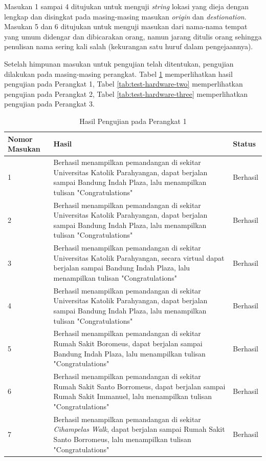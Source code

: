 Masukan 1 sampai 4 ditujukan untuk menguji \textit{string} lokasi yang dieja dengan lengkap dan disingkat pada masing-masing masukan \textit{origin} dan \textit{destionation}. Masukan 5 dan 6 ditujukan untuk menguji masukan dari nama-nama tempat yang umum didengar dan dibicarakan orang, namun jarang ditulis orang sehingga penulisan nama sering kali salah (kekurangan satu huruf dalam pengejaannya).

Setelah himpunan masukan untuk pengujian telah ditentukan, pengujian dilakukan pada masing-masing perangkat. Tabel \ref{tab:test-hardware-one} memperlihatkan hasil pengujian pada Perangkat 1, Tabel \ref{tab:test-hardware-two} memperlihatkan pengujian pada Perangkat 2, Tabel \ref{tab:test-hardware-three} memperlihatkan pengujian pada Perangkat 3.

\begin{table}[]
    \centering
    \caption{Hasil Pengujian pada Perangkat 1}
    \begin{tabular}{|p{3cm}||p{7cm}|p{4cm}|}
    \hline
       Nomor Masukan & Hasil & Status \\
    \hline \hline
        1 & Berhasil menampilkan pemandangan di sekitar Universitas Katolik Parahyangan, dapat berjalan sampai Bandung Indah Plaza, lalu menampilkan tulisan "Congratulations" & Berhasil\\
    \hline
        2 & Berhasil menampilkan pemandangan di sekitar Universitas Katolik Parahyangan, dapat berjalan sampai Bandung Indah Plaza, lalu menampilkan tulisan "Congratulations" & Berhasil \\
    \hline
        3 & Berhasil menampilkan pemandangan di sekitar Universitas Katolik Parahyangan, secara virtual dapat berjalan sampai Bandung Indah Plaza, lalu menampilkan tulisan "Congratulations" & Berhasil \\
        \hline
        4 & Berhasil menampilkan pemandangan di sekitar Universitas Katolik Parahyangan, dapat berjalan sampai Bandung Indah Plaza, lalu menampilkan tulisan "Congratulations" & Berhasil \\
        \hline
        5 & Berhasil menampilkan pemandangan di sekitar Rumah Sakit Boromeus, dapat berjalan sampai Bandung Indah Plaza, lalu menampilkan tulisan "Congratulations" & Berhasil\\ 
        \hline
        6 & Berhasil menampilkan pemandangan di sekitar Rumah Sakit Santo Borromeus, dapat berjalan sampai Rumah Sakit Immanuel, lalu menampilkan tulisan "Congratulations" & Berhasil \\
        \hline 
        7 & Berhasil menampilkan pemandangan di sekitar \textit{Cihampelas Walk}, dapat berjalan sampai Rumah Sakit Santo Borromeus, lalu menampilkan tulisan "Congratulations" & Berhasil \\
    \hline
    \end{tabular}
    \label{tab:test-hardware-one}
\end{table} 

